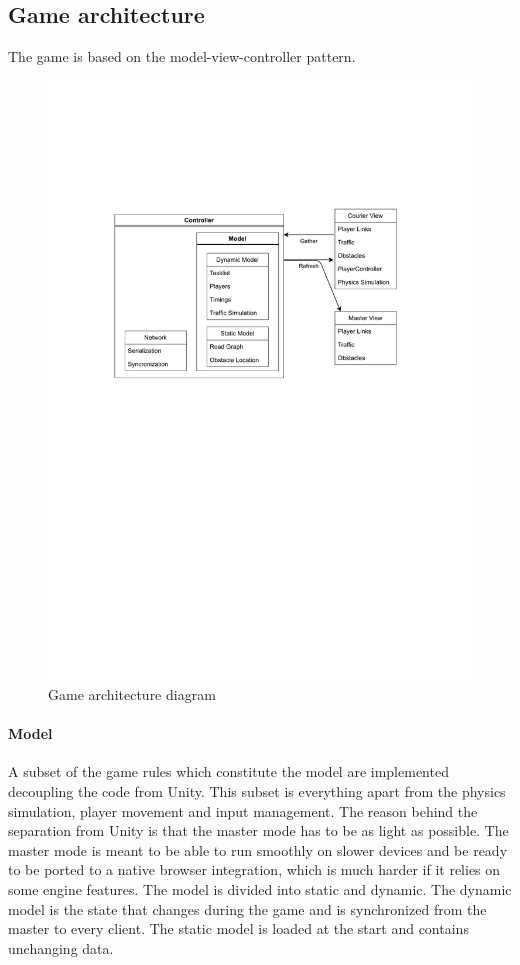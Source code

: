 \documentclass[12pt]{article}
\begin{document}
\subsection{Game architecture}
The game is based on the model-view-controller pattern. \cite{mvc}
\begin{figure}[H]
\includegraphics[width=\textwidth]{game architecture}
\caption{Game architecture diagram}
\label{fig:gamearch}
\end{figure}
\paragraph{Model}
A subset of the game rules which constitute the model are implemented decoupling the code from Unity. This subset is everything apart from the physics simulation, player movement and input management. The reason behind the separation from Unity is that the master mode has to be as light as possible. The master mode is meant to be able to run smoothly on slower devices and be ready to be ported to a native browser integration, which is much harder if it relies on some engine features. The model is divided into static and dynamic. The dynamic model is the state that changes during the game and is synchronized from the master to every client. The static model is loaded at the start and contains unchanging data.
\end{document}
